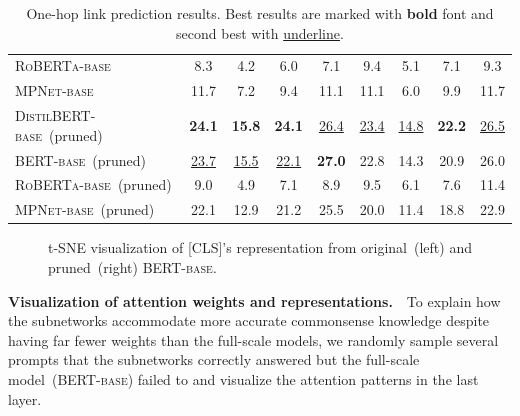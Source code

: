 \begin{table}[t!]
\begin{tabular}{l|cccc|cccc}
		\textsc{RoBERTa-base} &8.3 &4.2 &6.0 &7.1 &9.4 &5.1 &7.1 &9.3 \\
		\textsc{MPNet-base} &11.7 &7.2 &9.4 &11.1 &11.1 &6.0 &9.9 &11.7 \\
		\midrule
		\textsc{DistilBERT-base}~(pruned) &\textbf{24.1} &\textbf{15.8} &\textbf{24.1} &\underline{26.4} &\underline{23.4} &\underline{14.8} &\textbf{22.2} &\underline{26.5} \\
		\textsc{BERT-base}~(pruned) &\underline{23.7} &\underline{15.5} &\underline{22.1} &\textbf{27.0} &22.8 &14.3 &20.9 &26.0 \\
		\textsc{RoBERTa-base}~(pruned) &9.0 &4.9 &7.1 &8.9 &9.5 &6.1 &7.6 &11.4 \\
		\textsc{MPNet-base}~(pruned) &22.1 &12.9 &21.2 &25.5 &20.0 &11.4 &18.8 &22.9 \\
		\bottomrule
	\end{tabular}
	\caption{One-hop link prediction results. Best results are marked with \textbf{bold} font and second best with \underline{underline}.}
	\label{table:linkprediction}
\end{table}

\begin{figure}[t!]
	\centering
	\caption{t-SNE visualization of [CLS]'s representation from original~(left) and pruned~(right) \textsc{BERT-base}.} \label{fig:tsne}
\end{figure}
\noindent
\textbf{Visualization of attention weights and representations.}~~To explain 
how the subnetworks accommodate more accurate commonsense knowledge despite 
having far fewer weights than the full-scale models, we randomly 
sample several prompts that the subnetworks correctly answered but 
the full-scale model~(\textsc{BERT-base}) failed to and 
visualize the attention patterns in the last layer.



